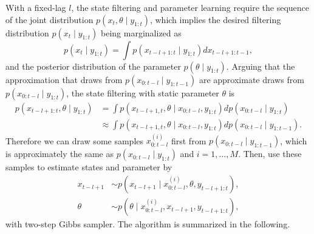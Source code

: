 With a fixed-lag $l$, the state filtering and parameter learning require the sequence of the joint distribution $p(x_t,\theta\mid y_{1:t})$, which implies the desired filtering distribution $p(x_t\mid y_{1:t})$ being marginalized as 
\begin{equation}
p(x_t\mid y_{1:t}) = \int p(x_{t-l+1:t}\mid y_{1:t}) dx_{t-l+1:t-1},
\end{equation}
and the posterior distribution of the parameter $p(\theta\mid y_{1:t})$. Arguing that the approximation that draws from $p(x_{0:t-l}\mid y_{1:t-1})$ are approximate draws from $p(x_{0:t-l}\mid y_{1:t})$, the state filtering with static parameter $\theta$ is 
\begin{equation}
\begin{split}
p(x_{t-l+1:t},\theta\mid y_{1:t}) &=\int p(x_{t-l+1,t},\theta \mid x_{0:t-l},y_{1:t}) dp(x_{0:t-l}\mid y_{1:t}) \\
&\approx \int p(x_{t-l+1,t},\theta \mid x_{0:t-l},y_{1:t}) dp(x_{0:t-l}\mid y_{1:t-1}).
\end{split}
\end{equation}
Therefore we can draw some samples $x_{0:t-l}^{(i)}$ first from $p(x_{0:t-l}\mid y_{1:t-1})$, which is approximately the same as $p(x_{0:t-l}\mid y_{1:t})$ and $i=1,\ldots,M$. Then, use these samples to estimate states and parameter by 
\begin{align}
x_{t-l+1} &\sim p\left(x_{t-l+1}\mid x_{0:t-l}^{(i)},\theta,y_{t-l+1:t}\right),\\
\theta &\sim p\left(\theta \mid x_{0:t-l}^{(i)},x_{t-l+1},y_{t-l+1:t}\right),
\end{align}
with two-step Gibbs sampler. The algorithm is summarized in the following. 
